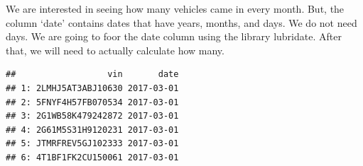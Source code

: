 \documentclass[]{book}
\newenvironment{Shaded}{\begin{snugshade}}{\end{snugshade}}
\newcommand{\CommentTok}[1]{\textcolor[rgb]{0.56,0.35,0.01}{\textit{#1}}}
\newcommand{\KeywordTok}[1]{\textcolor[rgb]{0.13,0.29,0.53}{\textbf{#1}}}
\newcommand{\NormalTok}[1]{#1}
\newcommand{\OperatorTok}[1]{\textcolor[rgb]{0.81,0.36,0.00}{\textbf{#1}}}
\newcommand{\StringTok}[1]{\textcolor[rgb]{0.31,0.60,0.02}{#1}}
\begin{document}
We are interested in seeing how many vehicles came in every month. But, the column `date' contains dates that have years, months, and days. We do not need days. We are going to foor the date column using the library lubridate. After that, we will need to actually calculate how many.

\begin{Shaded}
\end{Shaded}

\begin{verbatim}
##                  vin       date
## 1: 2LMHJ5AT3ABJ10630 2017-03-01
## 2: 5FNYF4H57FB070534 2017-03-01
## 3: 2G1WB58K479242872 2017-03-01
## 4: 2G61M5S31H9120231 2017-03-01
## 5: JTMRFREV5GJ102333 2017-03-01
## 6: 4T1BF1FK2CU150061 2017-03-01
\end{verbatim}

\begin{Shaded}
\end{Shaded}
\end{document}
